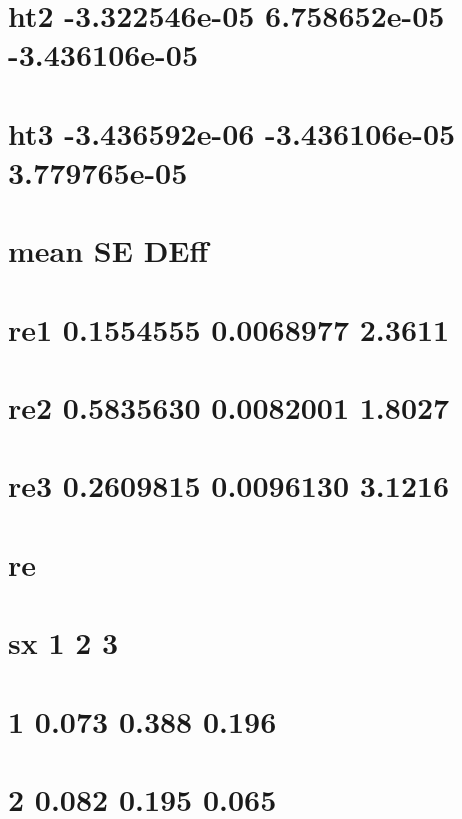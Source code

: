 \documentclass[]{book}
\theoremstyle{definition}
\theoremstyle{definition}
\theoremstyle{definition}
\theoremstyle{remark}
\begin{document}
\section{ht2 -3.322546e-05 6.758652e-05
-3.436106e-05}\label{ht2--3.322546e-05-6.758652e-05--3.436106e-05-2}

\section{ht3 -3.436592e-06 -3.436106e-05
3.779765e-05}\label{ht3--3.436592e-06--3.436106e-05-3.779765e-05-2}

\section{mean SE DEff}\label{mean-se-deff}

\section{re1 0.1554555 0.0068977
2.3611}\label{re1-0.1554555-0.0068977-2.3611}

\section{re2 0.5835630 0.0082001
1.8027}\label{re2-0.5835630-0.0082001-1.8027}

\section{re3 0.2609815 0.0096130
3.1216}\label{re3-0.2609815-0.0096130-3.1216}

\section{re}\label{re}

\section{sx 1 2 3}\label{sx-1-2-3}

\section{1 0.073 0.388 0.196}\label{section-58}

\section{2 0.082 0.195 0.065}\label{section-59}
\end{document}
